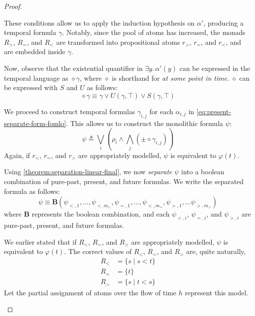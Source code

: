 \documentclass[a4paper,UKenglish,cleveref, autoref, thm-restate, numberwithinsect]{lipics-v2021}
\begin{document}
\begin{proof}
\begin{description}
        These conditions allow us to apply the induction hypothesis on $\alpha'$, producing a temporal formula $\gamma$. Notably, since the pool of atoms has increased, the monads $R_>$, $R_=$, and $R_<$ are transformed into propositional atoms $r_>$, $r_=$, and $r_<$, and are embedded inside $\gamma$.

        Now, observe that the existential quantifier in $\exists y.\, \alpha'(y)$ can be expressed in the temporal language as $\diamond \gamma$, where $\diamond$ is shorthand for \textit{at some point in time}. $\diamond$ can be expressed with $S$ and $U$ as follows:
        \begin{equation*}
            \diamond \gamma \equiv \gamma \lor U(\gamma,\top) \lor S(\gamma, \top)
        \end{equation*}

        We proceed to construct temporal formulas $\gamma_{i, j}$ for each $\alpha_{i, j}$ in \eqref{eq:present-separate-form-fomlo}. This allows us to construct the monolithic formula $\psi$:
        \begin{equation*}
            \psi \triangleq \bigvee_i \left( \rho_i \land \bigwedge_j \left( \pm \diamond \gamma_{i, j} \right) \right)
        \end{equation*}
        Again, if $r_<$, $r_=$, and $r_>$ are appropriately modelled, $\psi$ is equivalent to $\varphi(t)$.

        Using \cref{theorem:separation-linear-final}, we now \textit{separate} $\psi$ into a boolean combination of pure-past, present, and future formulas. We write the separated formula as follows:
        \begin{equation*}
            \psi \equiv \mathbf{B}(\psi_{<, 1}, \ldots, \psi_{<. m_<}, \psi_{=, 1}, \ldots, \psi_{<, m_=}, \psi_{>, 1}, \ldots \psi_{>, m_>})
        \end{equation*}
        where $\mathbf{B}$ represents the boolean combination, and each $\psi_{<, i}$, $\psi_{=, i}$, and $\psi_{>, i}$ are pure-past, present, and future formulas.

        We earlier stated that if $R_<$, $R_=$, and $R_>$ are appropriately modelled, $\psi$ is equivalent to $\varphi(t)$. The correct values of $R_<$, $R_=$, and $R_>$ are, quite naturally,
        \begin{equation*}
            \begin{aligned}
                R_< &= \{s \mid s < t\}\\
                R_= &= \{t\}\\
                R_> &= \{s \mid t < s\}
            \end{aligned}
        \end{equation*}
        Let the partial assignment of atoms over the flow of time $h$ represent this model.


\end{description}
\end{proof}
\end{document}
